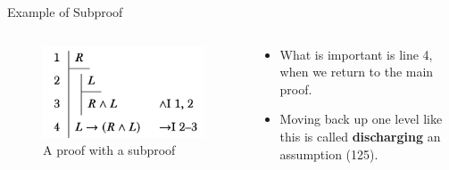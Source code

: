 \documentclass[
  ignorenonframetext,
]{beamer}
\providecommand{\tightlist}{%
  \setlength{\itemsep}{0pt}\setlength{\parskip}{0pt}}
\renewcommand{\,}{\text{, }}
\begin{document}
\begin{frame}{Example of Subproof}
\protect\hypertarget{example-of-subproof-2}{}
\begin{columns}[c]
\begin{column}{0.48\textwidth}
\begin{figure}
\centering
\includegraphics{4_7c.png}
\caption{A proof with a subproof}
\end{figure}
\end{column}

\begin{column}{0.48\textwidth}
\begin{itemize}
\tightlist
\item
  What is important is line 4, when we return to the main proof.
\item
  Moving back up one level like this is called \textbf{discharging} an
  assumption (125).
\end{itemize}
\end{column}
\end{columns}
\end{frame}
\end{document}
